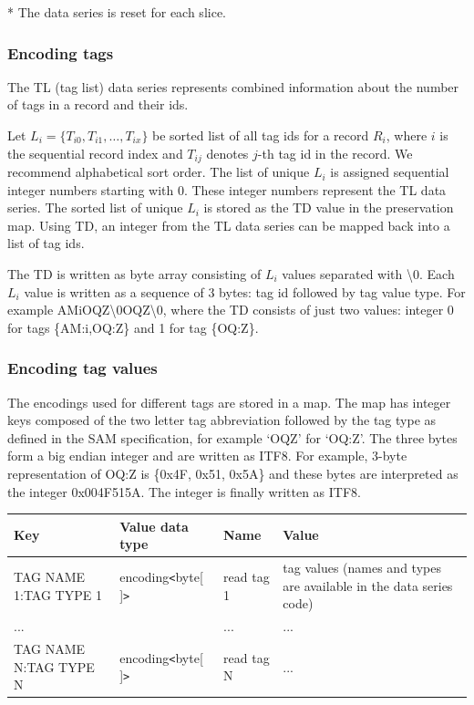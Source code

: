 \documentclass[a4paper]{article}
\begin{document}
* The data series is reset for each slice. 

\subsubsection*{Encoding tags}

The TL (tag list) data series represents combined information about the number 
of tags in a record and their ids. 

Let $L_{i}=\{T_{i0}, T_{i1}, \ldots, T_{ix}\}$
be sorted list of all tag ids for a record $R_{i}$, where $i$ is the sequential 
record index and $T_{ij}$ denotes $j$-th tag id in the record. We recommend 
alphabetical sort order. The list of unique $L_{i}$ is assigned sequential 
integer numbers starting with 0. These integer numbers represent the TL data series. 
The sorted list of unique $L_{i}$ is stored as the TD value in the preservation 
map. Using TD, an integer from the TL data series can be mapped back into a list 
of tag ids. 

The TD is written as byte array consisting of $L_{i}$ values separated 
with \textbackslash{}0. Each $L_{i}$ value is written as a sequence 
of 3 bytes: tag id followed by tag value type. For example AMiOQZ\textbackslash{}0OQZ\textbackslash{}0, 
where the TD consists of just two values: integer 0 for tags \{AM:i,OQ:Z\} and 
1 for tag \{OQ:Z\}.

\subsubsection*{Encoding tag values}

The encodings used for different tags are stored in a map. The map has integer 
keys composed of the two letter tag abbreviation followed by the tag type as defined 
in the SAM specification, for example `OQZ' for `OQ:Z'. The three bytes form a 
big endian integer and are written as ITF8. For example, 3-byte representation 
of OQ:Z is \{0x4F, 0x51, 0x5A\} and these bytes are interpreted as the integer 0x004F515A.
The integer is finally written as ITF8.

\begin{tabular}{|l|l|l|>{\raggedright}p{160pt}|}
\hline
\textbf{Key} & \textbf{Value data type} & \textbf{Name} & \textbf{Value}
\tabularnewline
\hline
TAG NAME 1:TAG TYPE 1 & encoding\texttt{<}byte[ ]\texttt{>} & read tag 1 & tag values 
(names and types are available in the data series code)\tabularnewline
\hline
... &  & ... & ...\tabularnewline
\hline
TAG NAME N:TAG TYPE N & encoding\texttt{<}byte[ ]\texttt{>} & read tag N & ...\tabularnewline
\hline
\end{tabular}
\end{document}
